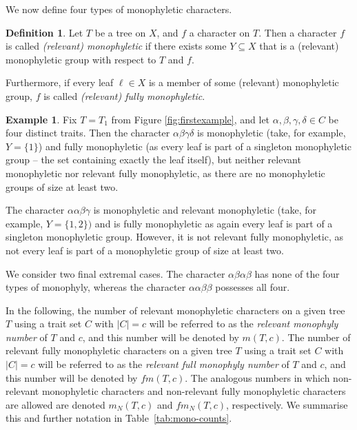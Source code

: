 \documentclass{amsart}
\theoremstyle{definition}
\newtheorem{definition}[theorem]{Definition}
\newtheorem{example}[theorem]{Example}
\begin{document}
We now define four types of monophyletic characters.


\begin{definition}
    Let $T$ be a tree on $X$, and $f$ a character on $T$. Then a character $f$ is called \emph{(relevant) monophyletic} if there exists some $Y \subseteq X$ that is a (relevant) monophyletic group with respect to $T$ and $f$.

    Furthermore, if every leaf $\ell \in X$ is a  member of some (relevant) monophyletic group, $f$ is called \emph{(relevant) fully monophyletic}.
\end{definition}

\begin{example}
    Fix $T=T_1$ from Figure \ref{fig:firstexample}, and let $\alpha, \beta, \gamma, \delta \in C$ be four distinct traits. Then the character $\alpha \beta \gamma \delta$ is monophyletic (take, for example, $Y=\{1\}$) and fully monophyletic (as every leaf is part of a singleton monophyletic group -- the set containing exactly the leaf itself), but neither relevant monophyletic nor relevant fully monophyletic, as there are no monophyletic groups of size at least two.

    The character $\alpha \alpha \beta \gamma$ is monophyletic and relevant monophyletic (take, for example, $Y=\{1,2\})$ and is fully monophyletic as again every leaf is part of a singleton monophyletic group. However, it is not relevant fully monophyletic, as not every leaf is part of a monophyletic group of size at least two.

    We consider two final extremal cases. The character $\alpha \beta \alpha \beta$ has none of the four types of monophyly, whereas the character $\alpha \alpha \beta \beta$ possesses all four.
\end{example}

In the following, the number of relevant monophyletic characters on a given tree $T$ using a trait set $C$ with $|C|=c$ will be referred to as the \emph{relevant monophyly number} of $T$ and $c$, and this number will be denoted by $m(T,c)$. The number of relevant fully monophyletic characters on a given tree $T$ using a trait set $C$ with $|C|=c$ will be referred to as the \emph{relevant full monophyly number} of $T$ and $c$, and this number will be denoted by $fm(T,c)$. The analogous numbers in which non-relevant monophyletic characters and non-relevant fully monophyletic characters are allowed are denoted $m_N(T,c)$ and $fm_N(T,c)$, respectively. We summarise this and further notation in Table~\ref{tab:mono-counts}.
\end{document}
